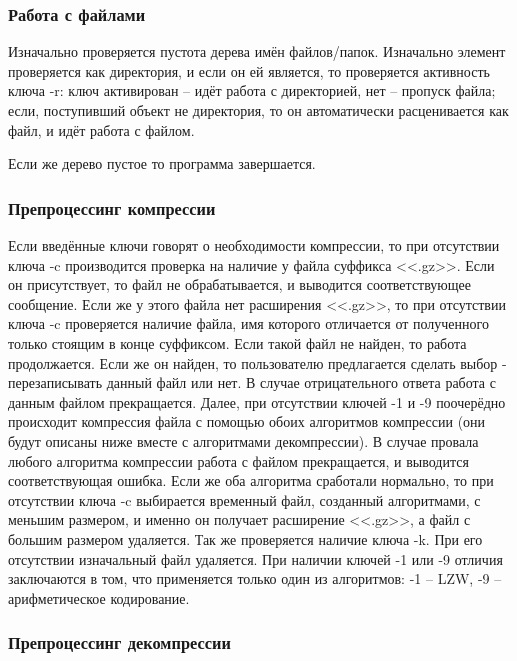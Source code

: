 \documentclass[12pt]{article}
\begin{document}
\subsubsection*{Работа с файлами}

Изначально проверяется пустота дерева имён файлов/папок. Изначально элемент проверяется как директория, и если он ей является, то проверяется активность ключа -r: ключ активирован -- идёт работа с директорией, нет -- пропуск файла; если, поступивший объект не директория, то он автоматически расценивается как файл, и идёт работа с файлом.

Если же дерево пустое то программа завершается.

\subsubsection*{Препроцессинг компрессии}

Если введённые ключи говорят о необходимости компрессии, то при отсутствии ключа -c производится проверка на наличие у файла суффикса <<.gz>>. Если он присутствует, то файл не обрабатывается, и выводится соответствующее сообщение. Если же у этого файла нет расширения <<.gz>>, то при отсутствии ключа -c проверяется наличие файла, имя которого отличается от полученного только стоящим в конце суффиксом. Если такой файл не найден, то работа продолжается. Если же он найден, то пользователю предлагается сделать выбор - перезаписывать данный файл или нет. В случае отрицательного ответа работа с данным файлом прекращается. Далее, при отсутствии ключей -1 и -9 поочерёдно происходит компрессия файла с помощью обоих алгоритмов компрессии (они будут описаны ниже вместе с алгоритмами декомпрессии). В случае провала любого алгоритма компрессии работа с файлом прекращается, и выводится соответствующая ошибка. Если же оба алгоритма сработали нормально, то при отсутствии ключа -c выбирается временный файл, созданный алгоритмами, с меньшим размером, и именно он получает расширение <<.gz>>, а файл с большим размером удаляется. Так же проверяется наличие ключа -k. При его отсутствии изначальный файл удаляется. При наличии ключей -1 или -9 отличия заключаются в том, что применяется только один из алгоритмов: -1 -- LZW, -9 -- арифметическое кодирование.

\subsubsection*{Препроцессинг декомпрессии}
\end{document}
